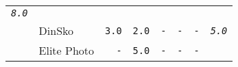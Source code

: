 \documentclass[11pt,A4paper,]{article}
\begin{document}
\begin{longtable}[]{@{}llrrrrrr@{}}
\begin{minipage}[t]{0.12\columnwidth}
\emph{\texttt{8.0}}\strut
\end{minipage}\tabularnewline
\begin{minipage}[t]{0.12\columnwidth}\raggedright\strut
\strut
\end{minipage} & \begin{minipage}[t]{0.12\columnwidth}\raggedright\strut
DinSko\strut
\end{minipage} & \begin{minipage}[t]{0.12\columnwidth}\raggedleft\strut
\texttt{3.0}\strut
\end{minipage} & \begin{minipage}[t]{0.12\columnwidth}\raggedleft\strut
\texttt{2.0}\strut
\end{minipage} & \begin{minipage}[t]{0.12\columnwidth}\raggedleft\strut
\texttt{-}\strut
\end{minipage} & \begin{minipage}[t]{0.12\columnwidth}\raggedleft\strut
\texttt{-}\strut
\end{minipage} & \begin{minipage}[t]{0.12\columnwidth}\raggedleft\strut
\texttt{-}\strut
\end{minipage} & \begin{minipage}[t]{0.12\columnwidth}\raggedleft\strut
\emph{\texttt{5.0}}\strut
\end{minipage}\tabularnewline
\begin{minipage}[t]{0.12\columnwidth}\raggedright\strut
\strut
\end{minipage} & \begin{minipage}[t]{0.12\columnwidth}\raggedright\strut
Elite Photo\strut
\end{minipage} & \begin{minipage}[t]{0.12\columnwidth}\raggedleft\strut
\texttt{-}\strut
\end{minipage} & \begin{minipage}[t]{0.12\columnwidth}\raggedleft\strut
\texttt{5.0}\strut
\end{minipage} & \begin{minipage}[t]{0.12\columnwidth}\raggedleft\strut
\texttt{-}\strut
\end{minipage} & \begin{minipage}[t]{0.12\columnwidth}\raggedleft\strut
\texttt{-}\strut
\end{minipage} & \begin{minipage}[t]{0.12\columnwidth}\raggedleft\strut
\texttt{-}\strut
\end{minipage} & \begin{minipage}[t]{0.12\columnwidth}\raggedleft\strut

\end{minipage}
\end{longtable}
\end{document}
